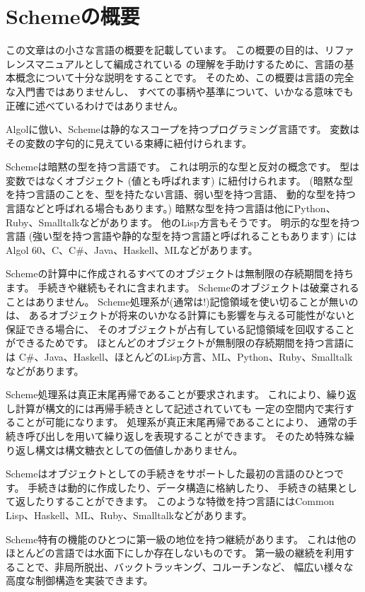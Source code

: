 \chapter*{Schemeの概要}

この文章は\rsevenrs{}の小さな言語の概要を記載しています。
この概要の目的は、リファレンスマニュアルとして編成されている
\rsevenrs{}の理解を手助けするために、言語の基本概念について十分な説明をすることです。
そのため、この概要は言語の完全な入門書ではありませんし、
すべての事柄や基準について、いかなる意味でも正確に述べているわけではありません。

\vest Algolに倣い、Schemeは静的なスコープを持つプログラミング言語です。
変数はその変数の字句的に見えている束縛に紐付けられます。

\vest Schemeは暗黙の型を持つ言語です。
これは明示的な型と反対の概念です。
型は変数ではなくオブジェクト (値とも呼ばれます) に紐付けられます。
(暗黙な型を持つ言語のことを、型を持たない言語、弱い型を持つ言語、
動的な型を持つ言語などと呼ばれる場合もあります。)
暗黙な型を持つ言語は他にPython、Ruby、Smalltalkなどがあります。
他のLisp方言もそうです。
明示的な型を持つ言語
(強い型を持つ言語や静的な型を持つ言語と呼ばれることもあります)
にはAlgol 60、C、C\#、Java、Haskell、MLなどがあります。

\vest Schemeの計算中に作成されるすべてのオブジェクトは無制限の存続期間を持ちます。
手続きや継続もそれに含まれます。
Schemeのオブジェクトは破棄されることはありません。
Scheme処理系が(通常は!)記憶領域を使い切ることが無いのは、
あるオブジェクトが将来のいかなる計算にも影響を与える可能性がないと保証できる場合に、
そのオブジェクトが占有している記憶領域を回収することができるためです。
ほとんどのオブジェクトが無制限の存続期間を持つ言語には
C\#、Java、Haskell、ほとんどのLisp方言、ML、Python、Ruby、Smalltalkなどがあります。

Scheme処理系は真正末尾再帰であることが要求されます。
これにより、繰り返し計算が構文的には再帰手続きとして記述されていても
一定の空間内で実行することが可能になります。
処理系が真正末尾再帰であることにより、
通常の手続き呼び出しを用いて繰り返しを表現することができます。
そのため特殊な繰り返し構文は構文糖衣としての価値しかありません。

\vest Schemeはオブジェクトとしての手続きをサポートした最初の言語のひとつです。
手続きは動的に作成したり、データ構造に格納したり、
手続きの結果として返したりすることができます。
このような特徴を持つ言語にはCommon Lisp、Haskell、ML、Ruby、Smalltalkなどがあります。

\vest Scheme特有の機能のひとつに第一級の地位を持つ継続があります。
これは他のほとんどの言語では水面下にしか存在しないものです。
第一級の継続を利用することで、非局所脱出、バックトラッキング、コルーチンなど、
幅広い様々な高度な制御構造を実装できます。

